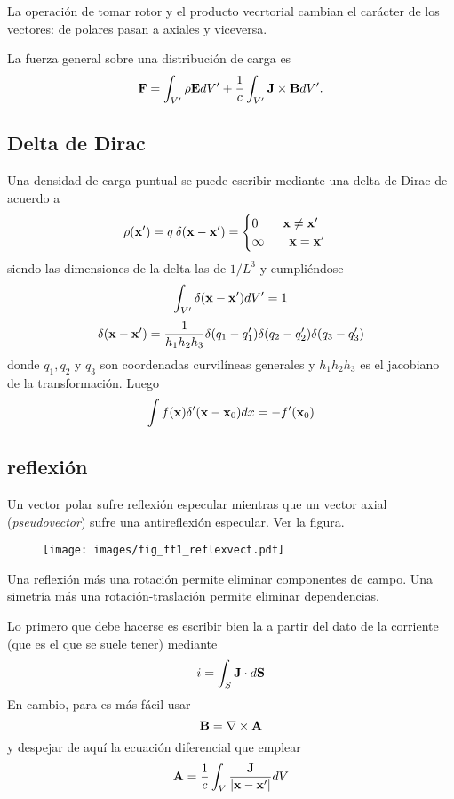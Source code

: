 \documentclass[10pt,oneside]{CBFT_book}
\begin{document}
La operación de tomar rotor y el producto vecrtorial cambian el carácter de los vectores: de
polares pasan a axiales y viceversa.

La fuerza general sobre una distribución de carga es
\[
	\vb{F} = \int_{V'} \rho \vb{E} dV' + \frac{1}{c} \int_{V'} \vb{J} \times \vb{B} dV'. 
\]

\subsection{Delta de Dirac}

Una densidad de carga puntual se puede escribir mediante una delta de Dirac de acuerdo a
\[
	\rho(\vb{x}') = q\: \delta (\vb{x} - \vb{x}') = \begin{cases}
	                                               0 \qquad \vb{x} \neq \vb{x}' \\
	                                               \infty \qquad \vb{x} = \vb{x}'\\
	                                              \end{cases}
\]
siendo las dimensiones de la delta las de $1/L^3$ y cumpliéndose 
\[
	\int_{V'} \delta (\vb{x} - \vb{x}') dV' = 1
\]
\[
	\delta (\vb{x} - \vb{x}') = \frac{1}{h_1h_2h_3} \delta(q_1-q_1') \delta(q_2-q_2') \delta(q_3-q_3')
\]
donde $q_1, q_2$ y $q_3$ son coordenadas curvilíneas generales y $h_1h_2h_3$ es el jacobiano
de la transformación.
Luego
\[
	\int f(\vb{x}) \delta' (\vb{x} - \vb{x}_0) dx = -f'(\vb{x}_0)
\]



\subsection{reflexión}

Un vector polar sufre reflexión especular mientras que un vector axial ({\it pseudovector})
sufre una antireflexión especular. Ver la figura.

\begin{figure}[htb]
	\begin{center}
	\texttt{[image: images/fig\_ft1\_reflexvect.pdf]}	 
	\end{center}
	\caption{}
\end{figure} 

Una reflexión más una rotación permite eliminar componentes de campo.
Una simetría más una rotación-traslación permite eliminar dependencias.

Lo primero que debe hacerse es escribir bien la  a partir del dato de la corriente
(que es el que se suele tener) mediante
\[
	i = \int_S \vb{J} \cdot d \vb{S}
\]
En cambio, para  es más fácil usar
\[
	\vb{B} = \rotorm{A}
\]
y despejar de aquí la ecuación diferencial que emplear
\[
	\vb{A} = \frac{1}{c} \int_V \frac{\vb{J}}{|\vb{x}-\vb{x}'|} dV
\]
\end{document}

